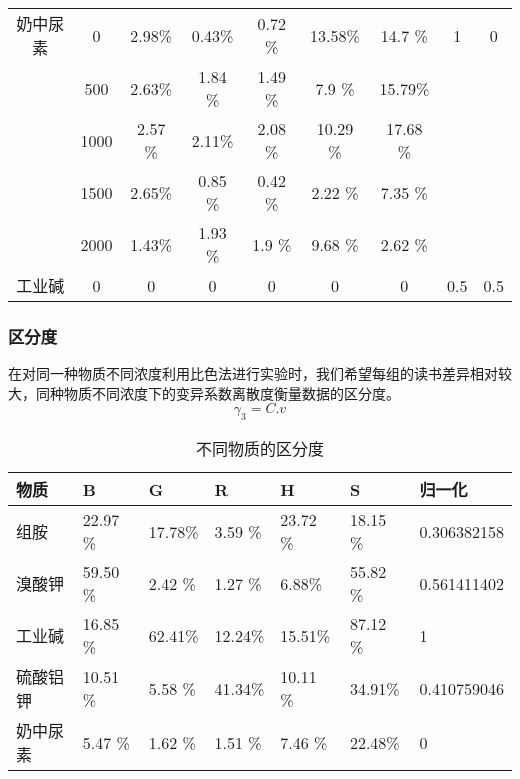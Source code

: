 \begin{table}[H]
\begin{tabular}{@{}ccccccccc@{}}
    奶中尿素 & 0    & 2.98\% & 0.43\% & 0.72 \% & 13.58\% & 14.7 \% & 1    & 0    \\
         & 500  & 2.63\% & 1.84 \%& 1.49 \% & 7.9  \% & 15.79\% &      &      \\
         & 1000 & 2.57 \%& 2.11\% & 2.08 \% & 10.29 \%& 17.68 \%&      &      \\
         & 1500 & 2.65\% & 0.85 \%& 0.42 \% & 2.22 \% & 7.35 \% &      &      \\
         & 2000 & 1.43\% & 1.93 \%& 1.9 \%  & 9.68 \% & 2.62  \%&      &      \\
    工业碱  & 0    & 0    & 0    & 0     & 0     & 0     & 0.5  & 0.5  \\ \bottomrule
    \end{tabular}
    \end{table}
    
    \subsubsection{区分度}
    在对同一种物质不同浓度利用比色法进行实验时，我们希望每组的读书差异相对较大，同种物质不同浓度下的变异系数离散度衡量数据的区分度。
    $$\gamma_3=C.v$$
    
    \begin{table}[H]
    \centering
    \caption{不同物质的区分度}
    \label{my-label}
    \begin{tabular}{@{}lllllll@{}}
    \toprule
    物质   & B     & G     & R     & H     & S     & 归一化         \\ \midrule
    组胺   & 22.97 \%& 17.78\% & 3.59 \% & 23.72 \%& 18.15 \%& 0.306382158 \\
    溴酸钾  & 59.50 \%& 2.42 \% & 1.27 \% & 6.88\%  & 55.82 \%& 0.561411402 \\
    工业碱  & 16.85 \%& 62.41\% & 12.24\% & 15.51\% & 87.12 \%& 1           \\
    硫酸铝钾 & 10.51 \%& 5.58 \% & 41.34\% & 10.11 \%& 34.91\% & 0.410759046 \\
    奶中尿素 & 5.47  \%& 1.62 \% & 1.51 \% & 7.46 \% & 22.48\% & 0           \\ \bottomrule
    \end{tabular}
    \end{table}
    
    
    
